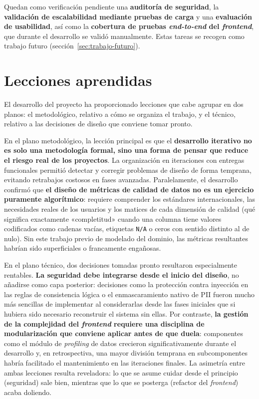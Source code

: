 Quedan como verificación pendiente una \textbf{auditoría de seguridad}, la
\textbf{validación de escalabilidad mediante pruebas de carga} y una
\textbf{evaluación de usabilidad}, así como la \textbf{cobertura de pruebas
\emph{end-to-end} del \emph{frontend}}, que durante el desarrollo se validó
manualmente.  Estas tareas se recogen como trabajo futuro
(sección~\ref{sec:trabajo-futuro}).


\section{Lecciones aprendidas}
\label{sec:lecciones}

El desarrollo del proyecto ha proporcionado lecciones que cabe agrupar
en dos planos: el metodológico, relativo a cómo se organiza el trabajo,
y el técnico, relativo a las decisiones de diseño que conviene tomar
pronto.

En el plano metodológico, la lección principal es que el \textbf{desarrollo
iterativo no es solo una metodología formal, sino una forma de pensar
que reduce el riesgo real de los proyectos}.  La organización en
iteraciones con entregas funcionales permitió detectar y corregir
problemas de diseño de forma temprana, evitando retrabajos costosos en
fases avanzadas.  Paralelamente, el desarrollo confirmó que \textbf{el
diseño de métricas de calidad de datos no es un ejercicio puramente
algorítmico}: requiere comprender los estándares internacionales, las
necesidades reales de los usuarios y los matices de cada dimensión de
calidad (qué significa exactamente «completitud» cuando una columna
tiene valores codificados como cadenas vacías, etiquetas
\texttt{N/A} o ceros con sentido distinto al de nulo).  Sin este trabajo
previo de modelado del dominio, las métricas resultantes habrían sido
superficiales o francamente engañosas.

En el plano técnico, dos decisiones tomadas pronto resultaron
especialmente rentables.  \textbf{La seguridad debe integrarse desde el
inicio del diseño}, no añadirse como capa posterior: decisiones como la
protección contra inyección en las reglas de consistencia lógica o el
enmascaramiento nativo de \ac{PII} fueron mucho más sencillas de
implementar al considerarlas desde las fases iniciales que si hubiera
sido necesario reconstruir el sistema sin ellas.  Por contraste, \textbf{la
gestión de la complejidad del \emph{frontend} requiere una disciplina
de modularización que conviene aplicar antes de que duela}: componentes
como el módulo de \emph{profiling} de datos crecieron significativamente
durante el desarrollo y, en retrospectiva, una mayor división temprana
en subcomponentes habría facilitado el mantenimiento en las iteraciones
finales.  La asimetría entre ambas lecciones resulta reveladora: lo que
se asume cuidar desde el principio (seguridad) sale bien, mientras que
lo que se posterga (refactor del \emph{frontend}) acaba doliendo.

